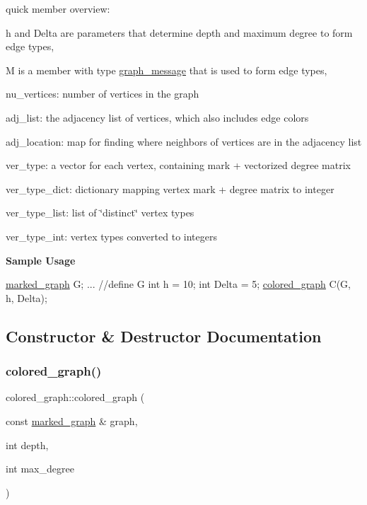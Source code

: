 quick member overview\+:


\begin{DoxyItemize}
\item h and Delta are parameters that determine depth and maximum degree to form edge types,
\item M is a member with type \hyperlink{classgraph__message}{graph\+\_\+message} that is used to form edge types,
\item nu\+\_\+vertices\+: number of vertices in the graph
\item adj\+\_\+list\+: the adjacency list of vertices, which also includes edge colors
\item adj\+\_\+location\+: map for finding where neighbors of vertices are in the adjacency list
\item ver\+\_\+type\+: a vector for each vertex, containing mark + vectorized degree matrix
\item ver\+\_\+type\+\_\+dict\+: dictionary mapping vertex mark + degree matrix to integer
\item ver\+\_\+type\+\_\+list\+: list of \char`\"{}distinct\char`\"{} vertex types
\item ver\+\_\+type\+\_\+int\+: vertex types converted to integers
\end{DoxyItemize}

{\bfseries Sample Usage}


\begin{DoxyCode}
\hyperlink{classmarked__graph}{marked\_graph} G;
... \textcolor{comment}{//define G}
\textcolor{keywordtype}{int} h = 10;
\textcolor{keywordtype}{int} Delta = 5;
\hyperlink{classcolored__graph}{colored\_graph} C(G, h, Delta);
\end{DoxyCode}
 

\subsection{Constructor \& Destructor Documentation}
\mbox{\label{classcolored__graph_a0374481a0474ac8e9b77689f74b5ed9b}} 
\subsubsection{\texorpdfstring{colored\+\_\+graph()}{colored\_graph()}\hspace{0.1cm}{\footnotesize\ttfamily [1/2]}}
{\footnotesize\ttfamily colored\+\_\+graph\+::colored\+\_\+graph (\begin{DoxyParamCaption}\item[{const \hyperlink{classmarked__graph}{marked\+\_\+graph} \&}]{graph,  }\item[{int}]{depth,  }\item[{int}]{max\+\_\+degree }\end{DoxyParamCaption})\hspace{0.3cm}{\ttfamily [inline]}}



